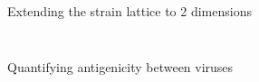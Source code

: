 \documentclass{beamer}
\begin{document}
\begin{frame}{Extending the strain lattice to 2 dimensions}
\begin{columns}
\begin{column}{0.5\textwidth}
\begin{figure}
            \end{figure}
        \end{column}
    \end{columns}
    \centering
    \vfill
    \tiny{\cite{gogDynamicsSelectionManystrain2002}}

\end{frame}




\begin{frame}{Quantifying antigenicity between viruses}
    \begin{figure}
        \centering
        \scalebox{0.9}{
        
        }
    \end{figure}
\end{frame}
\end{document}
